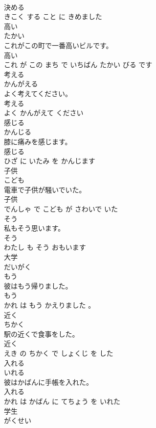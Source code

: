 \documentclass[8pt]{extreport}
\begin{document}
\begin{CJK}{UTF8}{min}
\\	決める 
\\	きこく する こと に きめました			
\\	高い	
\\	たかい			
\\	これがこの町で一番高いビルです。	
\\	高い 
\\	これ が この まち で いちばん たかい びる です			
\\	考える	
\\	かんがえる			
\\	よく考えてください。	
\\	考える 
\\	よく かんがえて ください			
\\	感じる	
\\	かんじる			
\\	膝に痛みを感じます。	
\\	感じる 
\\	ひざ に いたみ を かんじます			
\\	子供	
\\	こども			
\\	電車で子供が騒いでいた。	
\\	子供 
\\	でんしゃ で こども が さわいで いた			
\\	そう	
\\	私もそう思います。	
\\	そう 
\\	わたし も そう おもいます			
\\	大学	
\\	だいがく			
\\	もう	
\\	彼はもう帰りました。	
\\	もう 
\\	かれ は もう かえりました 。			
\\	近く	
\\	ちかく			
\\	駅の近くで食事をした。	
\\	近く 
\\	えき の ちかく で しょくじ を した			
\\	入れる	
\\	いれる			
\\	彼はかばんに手帳を入れた。	
\\	入れる 
\\	かれ は かばん に てちょう を いれた			
\\	学生	
\\	がくせい			

\end{CJK}
\end{document}
